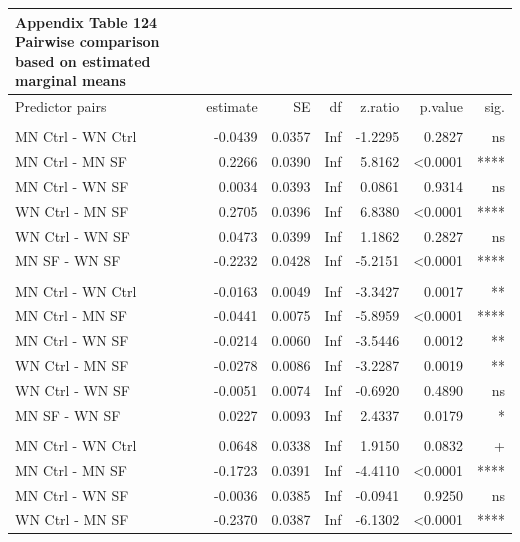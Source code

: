 \documentclass[
  12pt,
  letterpaper,
]{article}
\begin{document}
\begingroup
\fontsize{12.0pt}{14.4pt}\selectfont
\begin{longtable}{l|rrrrrr}
\caption*{
{\large \textbf{Appendix Table 124}} \\ 
{\small \textbf{Pairwise comparison based on estimated marginal means}}
} \\ 
\toprule
Predictor pairs & {estimate} & {SE} & {df} & {z.ratio} & {p.value} & {sig.} \\ 
\midrule\addlinespace[2.5pt]
\multicolumn{7}{l}{Lymphocytes} \\[2.5pt] 
\midrule\addlinespace[2.5pt]
MN Ctrl - WN Ctrl & -0.0439 & 0.0357 & Inf & -1.2295 & 0.2827 & ns \\ 
MN Ctrl - MN SF & 0.2266 & 0.0390 & Inf & 5.8162 & <0.0001 & **** \\ 
MN Ctrl - WN SF & 0.0034 & 0.0393 & Inf & 0.0861 & 0.9314 & ns \\ 
WN Ctrl - MN SF & 0.2705 & 0.0396 & Inf & 6.8380 & <0.0001 & **** \\ 
WN Ctrl - WN SF & 0.0473 & 0.0399 & Inf & 1.1862 & 0.2827 & ns \\ 
MN SF - WN SF & -0.2232 & 0.0428 & Inf & -5.2151 & <0.0001 & **** \\ 
\midrule\addlinespace[2.5pt]
\multicolumn{7}{l}{Monocytes} \\[2.5pt] 
\midrule\addlinespace[2.5pt]
MN Ctrl - WN Ctrl & -0.0163 & 0.0049 & Inf & -3.3427 & 0.0017 & ** \\ 
MN Ctrl - MN SF & -0.0441 & 0.0075 & Inf & -5.8959 & <0.0001 & **** \\ 
MN Ctrl - WN SF & -0.0214 & 0.0060 & Inf & -3.5446 & 0.0012 & ** \\ 
WN Ctrl - MN SF & -0.0278 & 0.0086 & Inf & -3.2287 & 0.0019 & ** \\ 
WN Ctrl - WN SF & -0.0051 & 0.0074 & Inf & -0.6920 & 0.4890 & ns \\ 
MN SF - WN SF & 0.0227 & 0.0093 & Inf & 2.4337 & 0.0179 & * \\ 
\midrule\addlinespace[2.5pt]
\multicolumn{7}{l}{Neutrophils} \\[2.5pt] 
\midrule\addlinespace[2.5pt]
MN Ctrl - WN Ctrl & 0.0648 & 0.0338 & Inf & 1.9150 & 0.0832 & + \\ 
MN Ctrl - MN SF & -0.1723 & 0.0391 & Inf & -4.4110 & <0.0001 & **** \\ 
MN Ctrl - WN SF & -0.0036 & 0.0385 & Inf & -0.0941 & 0.9250 & ns \\ 
WN Ctrl - MN SF & -0.2370 & 0.0387 & Inf & -6.1302 & <0.0001 & **** \\ 

\end{longtable}
\end{document}
